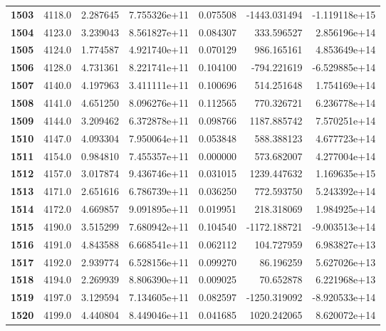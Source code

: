 \documentclass{report}[12pt]
\begin{document}
\begin{center}
\begin{tabular}{lrrrrrr}
\textbf{1503} &         4118.0 &   2.287645 &  7.755326e+11 &    0.075508 & -1443.031494 & -1.119118e+15 \\
\textbf{1504} &         4123.0 &   3.239043 &  8.561827e+11 &    0.084307 &   333.596527 &  2.856196e+14 \\
\textbf{1505} &         4124.0 &   1.774587 &  4.921740e+11 &    0.070129 &   986.165161 &  4.853649e+14 \\
\textbf{1506} &         4128.0 &   4.731361 &  8.221741e+11 &    0.104100 &  -794.221619 & -6.529885e+14 \\
\textbf{1507} &         4140.0 &   4.197963 &  3.411111e+11 &    0.100696 &   514.251648 &  1.754169e+14 \\
\textbf{1508} &         4141.0 &   4.651250 &  8.096276e+11 &    0.112565 &   770.326721 &  6.236778e+14 \\
\textbf{1509} &         4144.0 &   3.209462 &  6.372878e+11 &    0.098766 &  1187.885742 &  7.570251e+14 \\
\textbf{1510} &         4147.0 &   4.093304 &  7.950064e+11 &    0.053848 &   588.388123 &  4.677723e+14 \\
\textbf{1511} &         4154.0 &   0.984810 &  7.455357e+11 &    0.000000 &   573.682007 &  4.277004e+14 \\
\textbf{1512} &         4157.0 &   3.017874 &  9.436746e+11 &    0.031015 &  1239.447632 &  1.169635e+15 \\
\textbf{1513} &         4171.0 &   2.651616 &  6.786739e+11 &    0.036250 &   772.593750 &  5.243392e+14 \\
\textbf{1514} &         4172.0 &   4.669857 &  9.091895e+11 &    0.019951 &   218.318069 &  1.984925e+14 \\
\textbf{1515} &         4190.0 &   3.515299 &  7.680942e+11 &    0.104540 & -1172.188721 & -9.003513e+14 \\
\textbf{1516} &         4191.0 &   4.843588 &  6.668541e+11 &    0.062112 &   104.727959 &  6.983827e+13 \\
\textbf{1517} &         4192.0 &   2.939774 &  6.528156e+11 &    0.099270 &    86.196259 &  5.627026e+13 \\
\textbf{1518} &         4194.0 &   2.269939 &  8.806390e+11 &    0.009025 &    70.652878 &  6.221968e+13 \\
\textbf{1519} &         4197.0 &   3.129594 &  7.134605e+11 &    0.082597 & -1250.319092 & -8.920533e+14 \\
\textbf{1520} &         4199.0 &   4.440804 &  8.449046e+11 &    0.041685 &  1020.242065 &  8.620072e+14 \\

\end{tabular}
\end{center}
\end{document}
